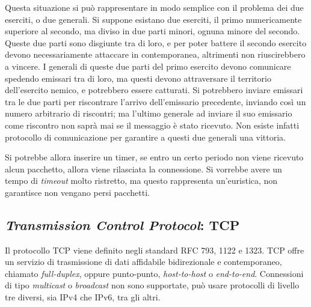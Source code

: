\documentclass{article}
\numberwithin{equation}{subsection}
\begin{document}
Questa situazione si può rappresentare in modo semplice con il problema dei due eserciti, o due generali. Si suppone esistano due eserciti, il primo numericamente 
superiore al secondo, ma diviso in due parti minori, ognuna minore del secondo. Queste due parti sono disgiunte tra di loro, e per poter battere il secondo esercito devono 
necessariamente attaccare in contemporanea, altrimenti non riuscirebbero a vincere. I generali di queste due parti del primo esercito devono comunicare spedendo 
emissari tra di loro, ma questi devono attraversare il territorio dell'esercito nemico, e potrebbero essere catturati. 
Si potrebbero inviare emissari tra le due parti per riscontrare l'arrivo dell'emissario precedente, inviando così un numero arbitrario di riscontri; ma l'ultimo generale ad inviare il suo emissario come 
riscontro non saprà mai se il messaggio è stato ricevuto. Non esiste infatti protocollo di comunicazione per garantire a questi due generali una vittoria. 

Si potrebbe allora inserire un timer, se entro un certo periodo non viene ricevuto alcun pacchetto, allora viene rilasciata la connessione. Si vorrebbe avere un tempo di \textit{timeout} molto ristretto, ma 
questo rappresenta un'euristica, non garantisce non vengano persi pacchetti. 

\subsection{\textit{Transmission Control Protocol}: \textcolor{Bittersweet}{TCP}}

Il protocollo \textcolor{Bittersweet}{TCP} viene definito negli standard RFC 793, 1122 e 1323. \textcolor{Bittersweet}{TCP} offre un servizio di trasmissione di dati affidabile bidirezionale e contemporaneo, chiamato 
\textit{full-duplex}, oppure punto-punto, \textit{host-to-host} o \textit{end-to-end}. Connessioni di tipo \textit{multicast} o \textit{broadcast} non sono supportate, può usare protocolli di livello tre 
diversi, sia \textcolor{BurntOrange}{IPv4} che \textcolor{OliveGreen}{IPv6}, tra gli altri. 
\end{document}
